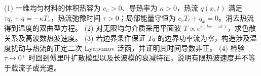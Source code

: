 (1) 一维均匀材料的体积热容为 \(c_v>0\)、导热率为 \(\kappa>0\)，热流 \(q(x,t)\) 满足 \(\tau q_t+q=-\kappa T_x\)，热流弛豫时间 \(\tau>0\)；局部能量守恒为 \(c_vT_t+q_x=0\)。消去热流得到温度的双曲型方程。
(2) 对无限均匀介质采用平面波 \(T\propto e^{i(kx-\omega t)}\)，求色散关系及高波数热波速度。
(3) 若边界条件保证 \(Tq\) 的边界功率流为零，构造涉及温度扰动与热流的正定二次 Lyapunov 泛函，并证明其时间导数非正。
(4) 检验 \(\tau\to0^+\) 时回到傅里叶扩散模型以及长波模的衰减特征，说明有限热波速度并不等于载流子或光速。
